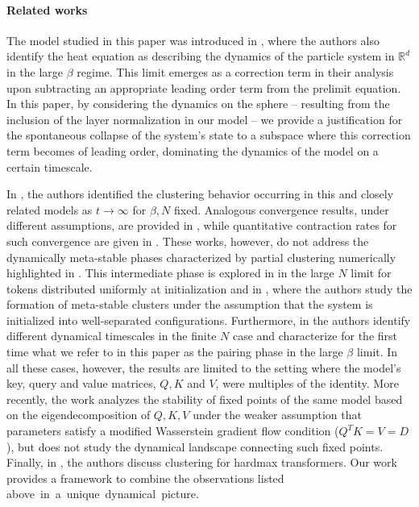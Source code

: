 \documentclass{article}
\numberwithin{theorem}{section}
\begin{document}
\paragraph{Related works}
The model studied in this paper was introduced in \cite{sander2022sinkformers}, where the authors also identify the heat equation as describing the dynamics of the particle system in $\mathbb R^d$ in the large $\beta$ regime. This limit emerges as a correction term in their analysis upon subtracting an appropriate leading order term from the prelimit equation.
In this paper, by considering the dynamics on the sphere -- resulting from the inclusion of the layer normalization in our model -- we provide a justification for the spontaneous collapse of the system's state to a subspace where this correction term becomes of leading order, dominating the dynamics of the model on a certain timescale.

In \cite{geshkovski2023mathematical, geshkovski2024emergence, karagodin2024clustering, castin2025unified, polyanskiy2025synchronization}, the authors identified the clustering behavior occurring in this and closely related models as $t \to \infty$ for $\beta, N$ fixed. Analogous convergence results, under different assumptions, are provided in \cite{ criscitiello2024synchronization, markdahl2017almost}, while quantitative contraction rates for such convergence are given in \cite{chen2025quantitative}. These works, however, do not address 
the  dynamically meta-stable phases characterized by partial clustering numerically highlighted in \cite{geshkovski2023mathematical}.
 This intermediate phase is explored in \cite{bruno2024emergence} in the large $N$ limit for tokens distributed uniformly at initialization and in \cite{geshkovski2024dynamic}, where the authors study the formation of meta-stable clusters under the assumption that the system is initialized into well-separated configurations.
 Furthermore, in \cite{geshkovski2024dynamic} the authors identify different dynamical timescales in the finite $N$ case and characterize for the first time what we refer to in this paper as the pairing phase in the large $\beta$ limit.
 In all these cases, however, the results are limited to the setting where the model's key, query and value matrices, $Q, K$ and $V$, were multiples of the identity. More recently, the work \cite{burger2025analysis} analyzes the stability of fixed points of the same model based on the eigendecomposition of $Q,K,V$ under the weaker assumption that parameters satisfy a modified Wasserstein gradient flow condition ($Q^TK=V=D$), but does not study the dynamical landscape connecting such fixed points. Finally, in \cite{alcalde2025clustering, alcalde2025attention}, the authors discuss clustering for hardmax transformers.
    Our work provides a framework to combine the observations listed above~in~a~unique~dynamical~picture.
\end{document}
